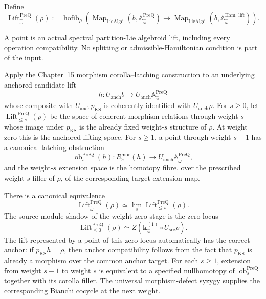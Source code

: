 \begin{definition}
\label{def:prequantum-differentiated-lift-space}
Define
\[
\boxed{
\operatorname{Lift}^{\mathrm{PreQ}}_{\widehat\omega}(\rho)
:=
\operatorname{hofib}_{\rho}
\left(
\operatorname{Map}_{\operatorname{LieAlgd}}
(b,\mathbb A_{\widehat\omega}^{\mathrm{PreQ}})
\longrightarrow
\operatorname{Map}_{\operatorname{LieAlgd}}
(b,\mathbb A_{\widehat\omega}^{\mathrm{Ham,\,lift}})
\right).
}
\]
\end{definition}

A point is an actual spectral partition-Lie algebroid lift, including every
operation compatibility.  No splitting or admissible-Hamiltonian condition is
part of the input.

\begin{construction}
\label{constr:prequantum-finite-weight-lift-tower}
Apply the Chapter~15 morphism corolla--latching construction to an underlying
anchored candidate lift
\[
h:U_{\mathrm{anch}}b
\longrightarrow
U_{\mathrm{anch}}\mathbb A_{\widehat\omega}^{\mathrm{PreQ}}
\]
whose composite with $U_{\mathrm{anch}}p_{\mathrm{KS}}$ is coherently identified
with $U_{\mathrm{anch}}\rho$.  For $s\ge0$, let
$\operatorname{Lift}^{\mathrm{PreQ}}_{\le s}(\rho)$ be the space of coherent
morphism relations through weight $s$ whose image under $p_{\mathrm{KS}}$ is the
already fixed weight-$s$ structure of $\rho$.  At weight zero this is the
anchored lifting space.  For $s\ge1$, a point through weight $s-1$ has a
canonical latching obstruction
\[
\operatorname{ob}^{\mathrm{PreQ}}_s(h):
R_s^{\mathrm{mor}}(h)
\longrightarrow
U_{\mathrm{anch}}\mathbb A_{\widehat\omega}^{\mathrm{PreQ}},
\]
and the weight-$s$ extension space is the homotopy fibre, over the prescribed
weight-$s$ filler of $\rho$, of the corresponding target extension map.
\end{construction}

\begin{theorem}
\label{thm:prequantum-complete-differentiated-ks-lift-tower}
There is a canonical equivalence
\[
\boxed{
\operatorname{Lift}^{\mathrm{PreQ}}_{\widehat\omega}(\rho)
\simeq
\lim_s\operatorname{Lift}^{\mathrm{PreQ}}_{\le s}(\rho).
}
\]
The source-module shadow of the weight-zero stage is the zero locus
\[
\boxed{
\operatorname{Lift}^{\mathrm{PreQ}}_{\le0}(\rho)
\simeq
Z\left(
\mathbf k_{\widehat\omega}^{(1)}
\circ U_{\mathrm{src}}\rho
\right).
}
\]
The lift represented by a point of this zero locus automatically has the correct
anchor: if $p_{\mathrm{KS}}h=\rho$, then anchor compatibility follows from the
fact that $p_{\mathrm{KS}}$ is already a morphism over the common anchor target.
For each $s\ge1$, extension from weight $s-1$ to weight $s$ is equivalent to a
specified nullhomotopy of $\operatorname{ob}^{\mathrm{PreQ}}_s$ together with its
corolla filler.  The universal morphism-defect syzygy supplies the corresponding
Bianchi cocycle at the next weight.
\end{theorem}

